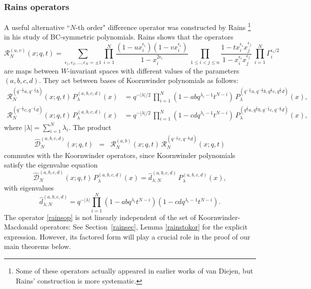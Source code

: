 \documentclass[12pt]{amsart}
\newcommand{\half}{\frac{1}{2}}
\numberwithin{equation}{section}
\begin{document}
\subsubsection{Rains operators}\label{rainsubsec}
A useful alternative ``$N$-th order" difference operator was constructed by
Rains \cite{Rains}\footnote{Some of these operators actually appeared in earlier works of van Diejen,
but Rains' construction is more systematic.} in his study of BC-symmetric polynomials. Rains shows that the  operators
\begin{equation}\label{rains}
{\mathcal R}_N^{(u,v)}(x;q,t)= \sum_{\epsilon_1,\epsilon_2,...,\epsilon_N=\pm 1} 
\prod_{i=1}^N \frac{(1-u x_i^{\epsilon_i})(1-v x_i^{\epsilon_i})}{1-x_i^{2\epsilon_i}}
\, \prod_{1\leq i<j\leq n} \frac{1- t x_i^{\epsilon_i}x_j^{\epsilon_j}}{1- x_i^{\epsilon_i}x_j^{\epsilon_j}}\,
\prod_{i=1}^N \Gamma_i^{\epsilon_i/2} 
\end{equation}
are maps between $W$-invariant spaces with different values of the parameters  $(a,b,c,d)$. They act between bases  of Koornwinder polynomials as follows:
\begin{equation}\label{rainskor}
\begin{array}{rl}
{\mathcal R}_N^{(q^{-\half}{a},q^{-\half}b)}(x;q,t)\, P_\lambda^{(a,b,c,d)}(x)&= q^{-|\lambda|/2} \, \prod_{i=1}^N (1-a b q^{\lambda_i-1} t^{N-i}) \, P_\lambda^{(q^{-\half}a,q^{-\half}b,q^{\half}c,q^{\half}d)}(x), \\
{\mathcal R}_N^{(q^{-\half}c,q^{-\half}d)}(x;q,t)\, P_\lambda^{(a,b,c,d)}(x)&= q^{-|\lambda|/2} \, \prod_{i=1}^N (1-c d q^{\lambda_i-1} t^{N-i}) \, P_\lambda^{(q^{\half}a,q^{\half}b,q^{-\half}c,q^{-\half}d)}(x),
\end{array}
\end{equation}
where $|\lambda|=\sum_{i=1}^N\lambda_i$.
The product
\begin{eqnarray}
\widehat{\mathcal D}_N^{(a,b,c,d)}(x;q,t)&=&{\mathcal R}_N^{(a,b)}(x;q,t)\,{\mathcal R}_N^{(q^{-\half}c,q^{-\half}d)}(x;q,t)\label{rainsop}
\end{eqnarray}
commutes with the Koornwinder operators, since Koornwinder polynomials satisfy the eigenvalue equation
$$
\widehat{\mathcal D}_N^{(a,b,c,d)}(x;q,t)\, P_\lambda^{(a,b,c,d)}(x)=\hat{d}_{\lambda;N}^{(a,b,c,d)}\, P_\lambda^{(a,b,c,d)}(x),
$$
with eigenvalues
\begin{equation}\label{eigenrains}
\hat{d}_{\lambda;N}^{(a,b,c,d)}=q^{-|\lambda|}\prod_{i=1}^N (1-a b q^{\lambda_i} t^{N-i})(1-c d q^{\lambda_i-1} t^{N-i}).
\end{equation}
The operator \eqref{rainsop} is not linearly independent of the set of Koornwinder-Macdonald operators: See Section~\ref{rainsec}, Lemma \ref{rainstokor} for the explicit expression. However, its factored form will play a crucial role in the proof of our main theorems below.
\end{document}
